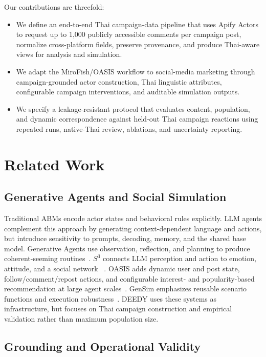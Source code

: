 \documentclass[conference]{IEEEtran}
\begin{document}
Our contributions are threefold:
\begin{itemize}
    \item We define an end-to-end Thai campaign-data pipeline that uses Apify
    Actors to request up to 1,000 publicly accessible comments per campaign
    post, normalize cross-platform fields, preserve provenance, and produce
    Thai-aware views for analysis and simulation.
    \item We adapt the MiroFish/OASIS workflow to social-media marketing through
    campaign-grounded actor construction, Thai linguistic attributes,
    configurable campaign interventions, and auditable simulation outputs.
    \item We specify a leakage-resistant protocol that evaluates content,
    population, and dynamic correspondence against held-out Thai campaign
    reactions using repeated runs, native-Thai review, ablations, and
    uncertainty reporting.
\end{itemize}

\section{Related Work}

\subsection{Generative Agents and Social Simulation}

Traditional ABMs encode actor states and behavioral rules explicitly. LLM
agents complement this approach by generating context-dependent language and
actions, but introduce sensitivity to prompts, decoding, memory, and the shared
base model. Generative Agents use observation, reflection, and planning to
produce coherent-seeming routines~\cite{park2023generative}. $S^3$ connects LLM
perception and action to emotion, attitude, and a social network
~\cite{gao2023s3}. OASIS adds dynamic user and post state, follow/comment/repost
actions, and configurable interest- and popularity-based recommendation at
large agent scales~\cite{yang2024oasis}. GenSim emphasizes reusable scenario
functions and execution robustness~\cite{tang2025gensim}. DEEDY uses these
systems as infrastructure, but focuses on Thai campaign construction and
empirical validation rather than maximum population size.

\subsection{Grounding and Operational Validity}
\end{document}
